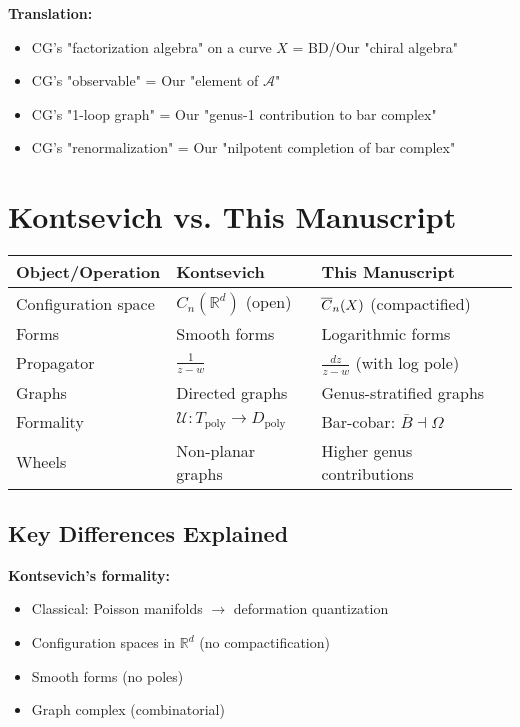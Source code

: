 \textbf{Translation:}
\begin{itemize}
\item CG's "factorization algebra" on a curve $X$ = BD/Our "chiral algebra"
\item CG's "observable" = Our "element of $\mathcal{A}$"
\item CG's "1-loop graph" = Our "genus-1 contribution to bar complex"
\item CG's "renormalization" = Our "nilpotent completion of bar complex"
\end{itemize}

\section{Kontsevich vs. This Manuscript}

\begin{center}
\begin{tabular}{|p{6cm}|p{4cm}|p{4cm}|}
\hline
\textbf{Object/Operation} & \textbf{Kontsevich \cite{Kon99}} & \textbf{This Manuscript} \\
\hline
Configuration space & $C_n(\mathbb{R}^d)$ (open) & $\overline{C}_{n}(X)$ (compactified) \\
Forms & Smooth forms & Logarithmic forms \\
Propagator & $\frac{1}{z-w}$ & $\frac{dz}{z-w}$ (with log pole) \\
Graphs & Directed graphs & Genus-stratified graphs \\
Formality & $\mathcal{U}: T_{\text{poly}} \to D_{\text{poly}}$ & Bar-cobar: $\bar{B} \dashv \Omega$ \\
Wheels & Non-planar graphs & Higher genus contributions \\
\hline
\end{tabular}
\end{center}

\subsection{Key Differences Explained}

\textbf{Kontsevich's formality:}
\begin{itemize}
\item Classical: Poisson manifolds $\to$ deformation quantization
\item Configuration spaces in $\mathbb{R}^d$ (no compactification)
\item Smooth forms (no poles)
\item Graph complex (combinatorial)
\end{itemize}

